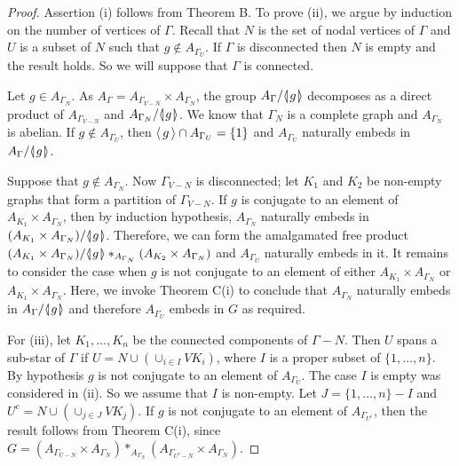 \documentclass[12pt, a4paper]{amsart}
\theoremstyle{remark}
\theoremstyle{definition}
\begin{document}
\begin{proof}
Assertion (i) follows from Theorem B. To prove (ii), we argue by induction on the number of vertices of ${\Gamma}$. Recall that $N$ is the set of nodal vertices of ${\Gamma}$ and $U$ is a subset of $N$ such that $g\notin A_{{\Gamma}_U}$. If ${\Gamma}$ is disconnected then $N$ is empty and the result holds. So we will suppose that ${\Gamma}$ is connected.

Let $g\in A_{{\Gamma}_N}$. As $A_{\Gamma}=A_{{\Gamma}_{V-N}}\times A_{{\Gamma}_N}$, the group $A_{\Gamma}/{{\langle}{\mkern-3.7mu}{\lvert}{\mkern1.2mu}{{g}}{\mkern1.2mu}{\rvert}{\mkern-3.7mu}{\rangle}}$ decomposes as a direct product of $A_{{\Gamma}_{V-N}}$ and $A_{{\Gamma}_N}/{{\langle}{\mkern-3.7mu}{\lvert}{\mkern1.2mu}{{g}}{\mkern1.2mu}{\rvert}{\mkern-3.7mu}{\rangle}}$. We know that ${\Gamma}_{N}$ is a complete graph and $A_{{\Gamma}_N}$ is abelian. If $g\notin A_{{\Gamma}_U}$,  then ${\langle\mkern3mu{g}\mkern3mu\rangle}\cap A_{{\Gamma}_U}=\{1\}$ and $A_{{\Gamma}_U}$ naturally embeds in $A_{\Gamma}/{{\langle}{\mkern-3.7mu}{\lvert}{\mkern1.2mu}{{g}}{\mkern1.2mu}{\rvert}{\mkern-3.7mu}{\rangle}}$.

Suppose that $g\notin A_{{\Gamma}_N}$. Now ${\Gamma}_{V-N}$ is disconnected; let $K_1$ and $K_2$ be non-empty graphs that form a partition of ${\Gamma}_{V-N}$. If $g$ is conjugate to an element of $A_{K_1}\times A_{{\Gamma}_N}$, then by induction hypothesis, $A_{{\Gamma}_N}$ naturally embeds in $(A_{K_1}\times A_{{\Gamma}_N})/{{\langle}{\mkern-3.7mu}{\lvert}{\mkern1.2mu}{{g}}{\mkern1.2mu}{\rvert}{\mkern-3.7mu}{\rangle}}$. Therefore, we can form the amalgamated free product $(A_{K_1}\times A_{{\Gamma}_N})/{{\langle}{\mkern-3.7mu}{\lvert}{\mkern1.2mu}{{g}}{\mkern1.2mu}{\rvert}{\mkern-3.7mu}{\rangle}} *_{A_{{\Gamma}_N}}(A_{K_2}\times A_{{\Gamma}_N})$ and $A_{{\Gamma}_U}$ naturally embeds in it.
It remains to consider the case when $g$ is not conjugate to an element of either $A_{K_1}\times A_{{\Gamma}_N}$ or $A_{K_1}\times A_{{\Gamma}_N}$. Here, we invoke Theorem C(i) to conclude that $A_{{\Gamma}_N}$ naturally embeds in $A_{\Gamma}/{{\langle}{\mkern-3.7mu}{\lvert}{\mkern1.2mu}{{g}}{\mkern1.2mu}{\rvert}{\mkern-3.7mu}{\rangle}}$ and therefore $A_{{\Gamma}_U}$ embeds in $G$ as required.

For (iii), let $K_1,\dots, K_n$ be the connected components of ${\Gamma}-N$. Then $U$ spans a sub-star of ${\Gamma}$ if $U=N\cup (\cup_{i\in I}VK_i)$, where $I$ is a proper subset of $\{1,\dots,n\}$. By hypothesis $g$ is not conjugate to an element of $A_{{\Gamma}_U}$. The case $I$ is empty was considered in (ii). So we assume that $I$ is non-empty. Let $J=\{1,\dots, n\}-I$ and $U^c=N\cup(\cup_{j\in J} VK_j)$. If $g$ is not conjugate to an element of $A_{{\Gamma}_{U^c}}$, then the result follows from Theorem C(i), since $G=(A_{\Gamma_{U-N}}\times A_{\Gamma_{N}})*_{A_{\Gamma_{N}}}(A_{\Gamma_{U^{c}-N}}\times A_{\Gamma_{N}})$.


\end{proof}
\end{document}
